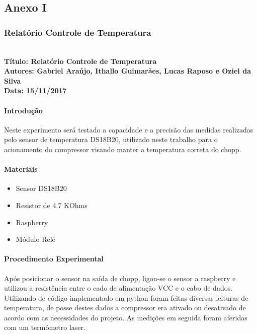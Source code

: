 \begin{anexosenv}

\partanexos

\chapter{Anexo I}

\subsection{Relatório Controle de Temperatura}
\textbf{ \\
  Título: Relatório Controle de Temperatura  \\
    Autores: Gabriel Araújo, Ithallo Guimarães, Lucas Raposo e Oziel da Silva\\
      Data: 15/11/2017} \\



\subsubsection{Introdução}
    Neste experimento será testado a capacidade e a precisão das medidas realizadas pelo sensor de temperatura DS18B20, utilizado neste trabalho para o acionamento do compressor visando manter a temperatura correta do chopp.

\subsubsection{Materiais}
\begin{itemize}
     \item Sensor DS18B20
     \item Resistor de 4.7 KOhms
     \item Raspberry
     \item Módulo Relé
         
\end{itemize}

\subsubsection{Procedimento Experimental}
     Após posicionar o sensor na saída de chopp, ligou-se o sensor a raspberry e utilizou a resistência entre o cado de alimentação VCC e o cabo de dados. Utilizando de código implementado em python foram feitas diversas leituras de temperatura, de posse destes dados a compressor era ativado ou desativado de acordo com as necessidades do projeto. As medições em seguida foram aferidas com um termômetro laser.

\end{anexosenv}
